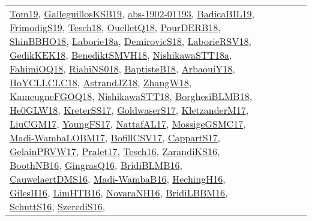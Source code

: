 {\begin{longtable}{lp{3cm}>{\raggedright}p{6cm}>{\raggedright}p{6cm}p{8cm}}
\href{papers/Tom19.pdf}{Tom19}\cite{Tom19}, \href{papers/GalleguillosKSB19.pdf}{GalleguillosKSB19}\cite{GalleguillosKSB19}, \href{articles/abs-1902-01193.pdf}{abs-1902-01193}\cite{abs-1902-01193}, \href{papers/BadicaBIL19.pdf}{BadicaBIL19}\cite{BadicaBIL19}, \href{papers/FrimodigS19.pdf}{FrimodigS19}\cite{FrimodigS19}, \href{papers/Tesch18.pdf}{Tesch18}\cite{Tesch18}, \href{papers/OuelletQ18.pdf}{OuelletQ18}\cite{OuelletQ18}, \href{articles/PourDERB18.pdf}{PourDERB18}\cite{PourDERB18}, \href{articles/ShinBBHO18.pdf}{ShinBBHO18}\cite{ShinBBHO18}, \href{papers/Laborie18a.pdf}{Laborie18a}\cite{Laborie18a}, \href{papers/DemirovicS18.pdf}{DemirovicS18}\cite{DemirovicS18}, \href{articles/LaborieRSV18.pdf}{LaborieRSV18}\cite{LaborieRSV18}, \href{articles/GedikKEK18.pdf}{GedikKEK18}\cite{GedikKEK18}, \href{papers/BenediktSMVH18.pdf}{BenediktSMVH18}\cite{BenediktSMVH18}, \href{papers/NishikawaSTT18a.pdf}{NishikawaSTT18a}\cite{NishikawaSTT18a}, \href{articles/FahimiOQ18.pdf}{FahimiOQ18}\cite{FahimiOQ18}, \href{papers/RiahiNS018.pdf}{RiahiNS018}\cite{RiahiNS018}, \href{articles/BaptisteB18.pdf}{BaptisteB18}\cite{BaptisteB18}, \href{papers/ArbaouiY18.pdf}{ArbaouiY18}\cite{ArbaouiY18}, \href{papers/HoYCLLCLC18.pdf}{HoYCLLCLC18}\cite{HoYCLLCLC18}, \href{papers/AstrandJZ18.pdf}{AstrandJZ18}\cite{AstrandJZ18}, \href{articles/ZhangW18.pdf}{ZhangW18}\cite{ZhangW18}, \href{papers/KameugneFGOQ18.pdf}{KameugneFGOQ18}\cite{KameugneFGOQ18}, \href{papers/NishikawaSTT18.pdf}{NishikawaSTT18}\cite{NishikawaSTT18}, \href{articles/BorghesiBLMB18.pdf}{BorghesiBLMB18}\cite{BorghesiBLMB18}, \href{papers/He0GLW18.pdf}{He0GLW18}\cite{He0GLW18}, \href{articles/KreterSS17.pdf}{KreterSS17}\cite{KreterSS17}, \href{papers/GoldwaserS17.pdf}{GoldwaserS17}\cite{GoldwaserS17}, \href{papers/KletzanderM17.pdf}{KletzanderM17}\cite{KletzanderM17}, \href{papers/LiuCGM17.pdf}{LiuCGM17}\cite{LiuCGM17}, \href{papers/YoungFS17.pdf}{YoungFS17}\cite{YoungFS17}, \href{articles/NattafAL17.pdf}{NattafAL17}\cite{NattafAL17}, \href{papers/MossigeGSMC17.pdf}{MossigeGSMC17}\cite{MossigeGSMC17}, \href{papers/Madi-WambaLOBM17.pdf}{Madi-WambaLOBM17}\cite{Madi-WambaLOBM17}, \href{papers/BofillCSV17.pdf}{BofillCSV17}\cite{BofillCSV17}, \href{papers/CappartS17.pdf}{CappartS17}\cite{CappartS17}, \href{papers/GelainPRVW17.pdf}{GelainPRVW17}\cite{GelainPRVW17}, \href{papers/Pralet17.pdf}{Pralet17}\cite{Pralet17}, \href{papers/Tesch16.pdf}{Tesch16}\cite{Tesch16}, \href{articles/ZarandiKS16.pdf}{ZarandiKS16}\cite{ZarandiKS16}, \href{papers/BoothNB16.pdf}{BoothNB16}\cite{BoothNB16}, \href{papers/GingrasQ16.pdf}{GingrasQ16}\cite{GingrasQ16}, \href{articles/BridiBLMB16.pdf}{BridiBLMB16}\cite{BridiBLMB16}, \href{papers/CauwelaertDMS16.pdf}{CauwelaertDMS16}\cite{CauwelaertDMS16}, \href{papers/Madi-WambaB16.pdf}{Madi-WambaB16}\cite{Madi-WambaB16}, \href{papers/HechingH16.pdf}{HechingH16}\cite{HechingH16}, \href{papers/GilesH16.pdf}{GilesH16}\cite{GilesH16}, \href{papers/LimHTB16.pdf}{LimHTB16}\cite{LimHTB16}, \href{articles/NovaraNH16.pdf}{NovaraNH16}\cite{NovaraNH16}, \href{papers/BridiLBBM16.pdf}{BridiLBBM16}\cite{BridiLBBM16}, \href{papers/SchuttS16.pdf}{SchuttS16}\cite{SchuttS16}, \href{papers/SzerediS16.pdf}{SzerediS16}\cite{SzerediS16}, 
\end{longtable}}
